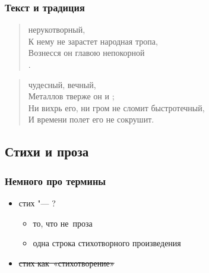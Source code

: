\documentclass{beamer}
\begin{document}

\begin{frame}
\frametitle{Текст и традиция}

\begin{verse}
\color{red}{Я памятник себе воздвиг} \color{black}нерукотворный,\\
К нему не зарастет народная тропа,\\
Вознесся \color{green}{выше} \color{black}он главою непокорной\\
\color{green}{Александрийского столпа}.
\end{verse}

\begin{flushleft}
\color{black}{\large vs.}
\end{flushleft}

\begin{verse}
\color{red}{Я памятник себе воздвиг} \color{black}чудесный, вечный,\\
Металлов тверже он и \color{green}{выше пирамид};\\
\color{black}Ни вихрь его, ни гром не сломит быстротечный,\\
И времени полет его не сокрушит.
\end{verse}

\end{frame}


\subsection{Стихи и проза}\label{sec:diff}


\begin{frame}
\frametitle{Немного про термины}
\begin{itemize}
\item стих "--- ? 
\begin{itemize}
\item то, что не~проза
\item одна строка стихотворного произведения
\end{itemize}
\item \sout{стих как~«стихотворение»}
\end{itemize}
\end{frame}

\end{document}
